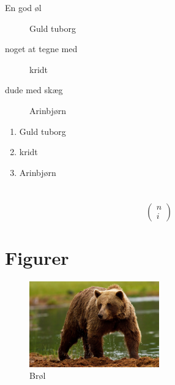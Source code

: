 \documentclass{article}                                                        %
\begin{document}
\begin{description}
	\item[En god øl] Guld tuborg
	
	\item[noget at tegne med] kridt 
	
	\item[dude med skæg] Arinbjørn
\end{description}


\begin{enumerate}
	\item Guld tuborg
	
	\item kridt 
	
	\item Arinbjørn
\end{enumerate}

\section{}

$$
\left(
	\begin{array}{c}
	n \\
	i 
	\end{array}
\right)
$$

\section{Figurer}
\begin{figure}[h!]
    \centering
    \includegraphics[width=0.5\textwidth]{bear.jpg}
    \caption{Brøl}
\end{figure}
\end{document}
